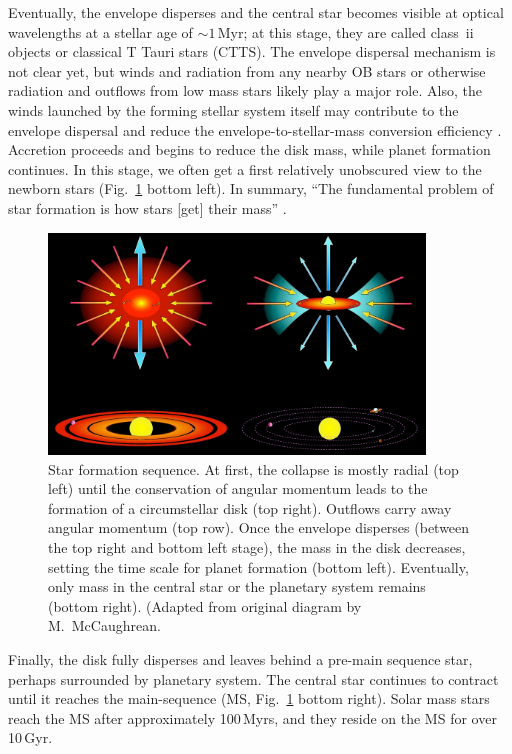 \documentclass[graybox, nosecnum]{svmult}
\begin{document}
Eventually, the envelope disperses and the central star becomes visible at optical wavelengths at a stellar age of $\sim1\,$Myr; at this stage, they are called class~{\sc ii} objects or classical T Tauri stars (CTTS). The envelope dispersal mechanism is not clear yet, but winds and radiation from any nearby OB stars or otherwise radiation and outflows from low mass stars likely play a major role. Also, the winds launched by the forming stellar system itself may contribute to the envelope dispersal and reduce the envelope-to-stellar-mass conversion efficiency \citep{Frank_2014}. Accretion proceeds and begins to reduce the disk mass, while planet formation continues. In this stage,  we often get a first relatively unobscured view to the newborn stars (Fig.~\ref{fig:starform_classes} bottom left). In summary, ``The fundamental problem of star formation is how stars [get] their mass'' \citep{Dunham_2014}.


\begin{figure}[t]
\centering
\includegraphics[width=10cm]{figs/starform_classes.png}
\caption{Star formation sequence. At first, the collapse is mostly radial (top left) until the conservation of angular momentum leads to the formation of a circumstellar disk (top right). Outflows carry away angular momentum (top row). Once the envelope disperses (between the top right and bottom left stage), the mass in the disk decreases, setting the time scale for planet formation (bottom left). Eventually, only mass in the central star or the planetary system remains (bottom right). (Adapted from original diagram by M.~McCaughrean. \label{fig:starform_classes}}
\end{figure}

Finally, the disk fully disperses and leaves behind a pre-main sequence star, perhaps surrounded by planetary system. The central star continues to contract until it reaches the main-sequence (MS, Fig.~\ref{fig:starform_classes} bottom right). Solar mass stars reach the MS after approximately 100\,Myrs, and they reside on the MS for over 10\,Gyr.
\end{document}

